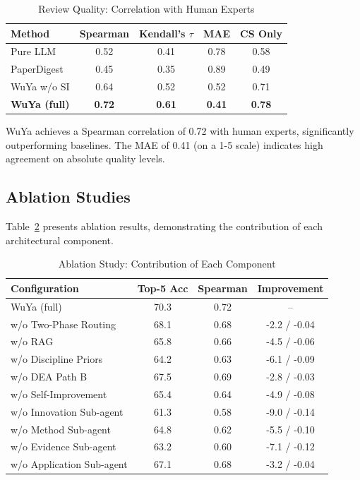 \begin{table}[t]
\centering
\caption{Review Quality: Correlation with Human Experts}
\label{tab:review-quality}
\begin{tabular}{@{}lcccc@{}}
\toprule
\textbf{Method} & \textbf{Spearman} & \textbf{Kendall's $\tau$} & \textbf{MAE} & \textbf{CS Only} \\
\midrule
Pure LLM & 0.52 & 0.41 & 0.78 & 0.58 \\
PaperDigest & 0.45 & 0.35 & 0.89 & 0.49 \\
WuYa w/o SI & 0.64 & 0.52 & 0.52 & 0.71 \\
\textbf{WuYa (full)} & \textbf{0.72} & \textbf{0.61} & \textbf{0.41} & \textbf{0.78} \\
\bottomrule
\end{tabular}
\end{table}

WuYa achieves a Spearman correlation of 0.72 with human experts, significantly outperforming baselines. The MAE of 0.41 (on a 1-5 scale) indicates high agreement on absolute quality levels.

\subsection{Ablation Studies}

Table~\ref{tab:ablation} presents ablation results, demonstrating the contribution of each architectural component.

\begin{table}[t]
\centering
\caption{Ablation Study: Contribution of Each Component}
\label{tab:ablation}
\begin{tabular}{@{}lccc@{}}
\toprule
\textbf{Configuration} & \textbf{Top-5 Acc} & \textbf{Spearman} & \textbf{Improvement} \\
\midrule
WuYa (full) & 70.3 & 0.72 & -- \\
\midrule
w/o Two-Phase Routing & 68.1 & 0.68 & -2.2 / -0.04 \\
w/o RAG & 65.8 & 0.66 & -4.5 / -0.06 \\
w/o Discipline Priors & 64.2 & 0.63 & -6.1 / -0.09 \\
w/o DEA Path B & 67.5 & 0.69 & -2.8 / -0.03 \\
w/o Self-Improvement & 65.4 & 0.64 & -4.9 / -0.08 \\
\midrule
w/o Innovation Sub-agent & 61.3 & 0.58 & -9.0 / -0.14 \\
w/o Method Sub-agent & 64.8 & 0.62 & -5.5 / -0.10 \\
w/o Evidence Sub-agent & 63.2 & 0.60 & -7.1 / -0.12 \\
w/o Application Sub-agent & 67.1 & 0.68 & -3.2 / -0.04 \\
\bottomrule
\end{tabular}
\end{table}

